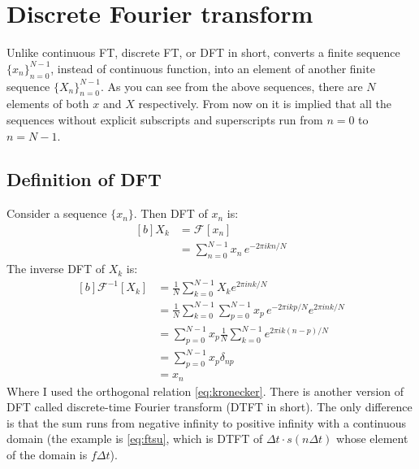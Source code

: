 \documentclass[letterpaper, 11pt]{article}
\newcommand{\fourier}[2]{\mathcal{F}_{#1}[#2]} %
\newcommand{\ifourier}[2]{\mathcal{F}_{#1}^{-1}[#2]} %
\newcommand{\ssum}[1]{\sum_{#1 = 0}^{N - 1}} %
\newcommand{\dft}[3]{\ssum{#1} #2 e^{-2\pi i#3#1/N}} %
\newcommand{\idft}[3]{\frac{1}{N}\ssum{#1} #2 e^{2\pi i#3#1/N}} %
\numberwithin{equation}{section}
\numberwithin{figure}{section}
\numberwithin{table}{section}
\begin{document}
\clearpage

\section{Discrete Fourier transform}
Unlike continuous FT, discrete FT, or DFT in short, converts a finite sequence \(\{x_{n}\}_{n=0}^{N-1} \), instead of continuous function, into an element of another finite sequence \( \{X_{n}\}_{n=0}^{N-1} \). As you can see from the above sequences, there are \(N\) elements of both \(x\) and \(X\) respectively. From now on it is implied that all the sequences without explicit subscripts and superscripts run from \(n=0\) to \(n=N-1\).   

\subsection{Definition of DFT}
Consider a sequence \(\{x_{n}\}\). Then DFT of \(x_{n}\) is:
\begin{equation}
	\begin{aligned}[b]
		X_{k}	&= \fourier{}{x_{n}}\\
			&= \dft{n}{x_{n}\,}{k}
	\end{aligned}
\end{equation}
The inverse DFT of \(X_{k}\) is:
\begin{equation}
	\begin{aligned}[b]
		\ifourier{}{X_{k}}
			&= \idft{k}{X_{k}}{n}\\
			&= \idft{k}{\dft{p}{x_{p}\,}{k}}{n}\\
			&= \ssum{p} x_{p} \frac{1}{N}\ssum{k} e^{2\pi ik(n-p)/N}\\
			&= \ssum{p} x_{p} \delta_{np}\\
			&= x_{n}
	\end{aligned}
\end{equation}
Where I used the orthogonal relation \eqref{eq:kronecker}\cite{james}. There is another version of DFT called discrete-time Fourier transform (DTFT in short). The only difference is that the sum runs from negative infinity to positive infinity with a continuous domain (the example is \eqref{eq:ftsu}, which is DTFT of \(\Delta t\cdot s(n\Delta t)\) whose element of the domain is \(f\Delta t\)). 

\end{document}
